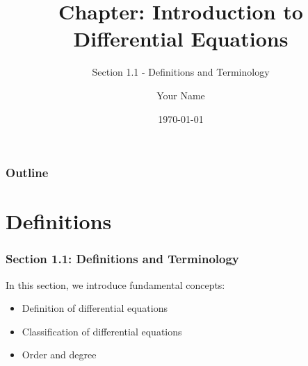 


\title[Chapter Title]{Chapter: Introduction to Differential Equations}
\subtitle{Section 1.1 - Definitions and Terminology}
\author{Your Name}
\date{\today}



\begin{frame}
    \titlepage
\end{frame}

\begin{frame}
    \frametitle{Outline}
    \tableofcontents
\end{frame}

\section{Definitions}

\begin{frame}
    \frametitle{Section 1.1: Definitions and Terminology}
    
    In this section, we introduce fundamental concepts:
    \begin{itemize}
        \item Definition of differential equations
        \item Classification of differential equations
        \item Order and degree
    \end{itemize}
\end{frame}


